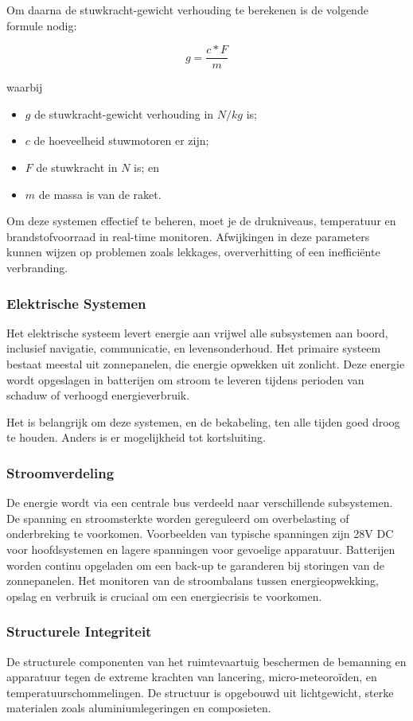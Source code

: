 Om daarna de stuwkracht-gewicht verhouding te berekenen is de volgende formule nodig:

$$g=\frac{c*F}{m}$$

waarbij
\begin{itemize}
    \item $g$ de stuwkracht-gewicht verhouding in $N/kg$ is;
    \item $c$ de hoeveelheid stuwmotoren er zijn;
    \item $F$ de stuwkracht in $N$ is; en
    \item $m$ de massa is van de raket.
\end{itemize}

Om deze systemen effectief te beheren, moet je de drukniveaus, temperatuur en brandstofvoorraad in real-time monitoren. Afwijkingen in deze parameters kunnen wijzen op problemen zoals lekkages, oververhitting of een inefficiënte verbranding.

\subsubsection{Elektrische Systemen}
Het elektrische systeem levert energie aan vrijwel alle subsystemen aan boord, inclusief navigatie, communicatie, en levensonderhoud. Het primaire systeem bestaat meestal uit zonnepanelen, die energie opwekken uit zonlicht. Deze energie wordt opgeslagen in batterijen om stroom te leveren tijdens perioden van schaduw of verhoogd energieverbruik.

Het is belangrijk om deze systemen, en de bekabeling, ten alle tijden goed droog te houden. Anders is er mogelijkheid tot kortsluiting.

\subsubsection{Stroomverdeling}
De energie wordt via een centrale bus verdeeld naar verschillende subsystemen. De spanning en stroomsterkte worden gereguleerd om overbelasting of onderbreking te voorkomen. Voorbeelden van typische spanningen zijn 28V DC voor hoofdsystemen en lagere spanningen voor gevoelige apparatuur. Batterijen worden continu opgeladen om een back-up te garanderen bij storingen van de zonnepanelen. Het monitoren van de stroombalans tussen energieopwekking, opslag en verbruik is cruciaal om een energiecrisis te voorkomen.

\subsubsection{Structurele Integriteit}
De structurele componenten van het ruimtevaartuig beschermen de bemanning en apparatuur tegen de extreme krachten van lancering, micro-meteoroïden, en temperatuurschommelingen. De structuur is opgebouwd uit lichtgewicht, sterke materialen zoals aluminiumlegeringen en composieten.

